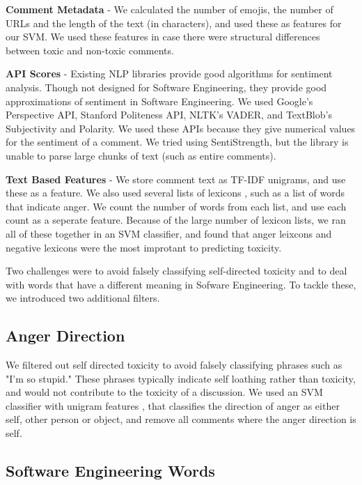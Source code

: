 \documentclass[conference]{IEEEtran}
\begin{document}
\textbf{Comment Metadata} - We calculated the number of emojis, the number of URLs and the length of the text (in characters), and used these as features for our SVM. We used these features in case there were structural differences between toxic and non-toxic comments.  

\textbf{API Scores} - Existing NLP libraries provide good algorithms for sentiment analysis. Though not designed for Software Engineering, they provide good approximations of sentiment in Software Engineering. We used Google's Perspective API, Stanford Politeness API, NLTK's VADER, and TextBlob's Subjectivity and Polarity. We used these APIs because they give numerical values for the sentiment of a comment. We tried using SentiStrength, but the library is unable to parse large chunks of text (such as entire comments). 

\textbf{Text Based Features} - We store comment text as TF-IDF unigrams, and use these as a feature. We also used several lists of lexicons  \cite{zhang2018conversations}, such as a list of words that indicate anger. We count the number of words from each list, and use each count as a seperate feature. Because of the large number of lexicon lists, we ran all of these together in an SVM classifier, and found that anger leixcons and negative lexicons were the most improtant to predicting toxicity. 

Two challenges were to avoid falsely classifying self-directed toxicity and to deal with words that have a different meaning in Sofware Engineering. To tackle these, we introduced two additional filters. 


\subsection{Anger Direction} 

We filtered out self directed toxicity to avoid falsely classifying phrases such as "I'm so stupid." These phrases typically indicate self loathing rather than toxicity, and would not contribute to the toxicity of a discussion. We used an SVM classifier with unigram features \cite{gachechiladze2017anger}, that classifies the direction of anger as either self, other person or object, and remove all comments where the anger direction is self.  

\subsection{Software Engineering Words} 
\end{document}

